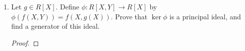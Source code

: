 \documentclass[../psets.tex]{subfiles}
\begin{document}
\begin{enumerate}
\begin{enumerate}[label={(\roman*)}]
\begin{proof}
            To prove that $\ker\phi$ is a principal ideal and identify its generator in the process, it will suffice to show that $\ker\phi=(X-a)$.\par
            Suppose first that $f\in\ker\phi$. It follows by the definition of the kernel that $f(a)=\phi(f)=0$. Additionally, recall from class that there exists $q\in R[X]$ such that
            \begin{equation*}
                f(X)-f(a) = q(X)(X-a)
            \end{equation*}
            But since $f(a)=0$, we have that
            \begin{equation*}
                f = f-0 = q\cdot(X-a) \in R[X](X-a) = (X-a)
            \end{equation*}
            as desired.\par
            Now suppose that $f\in(X-a)$. Then $f=q\cdot(X-a)$ for some $q\in R[X]$. It follows that
            \begin{equation*}
                \phi(f) = f(a)
                = q(a)\cdot(a-a)
                = q(a)\cdot 0
                = 0
            \end{equation*}
            so $f\in\ker\phi$, as desired.
        \end{proof}
        \item Let $g\in R[X]$. Define $\phi:R[X,Y]\to R[X]$ by $\phi(f(X,Y))=f(X,g(X))$. Prove that $\ker\phi$ is a principal ideal, and find a generator of this ideal.
        \begin{proof}




\end{proof}
\end{enumerate}
\end{enumerate}
\end{document}
